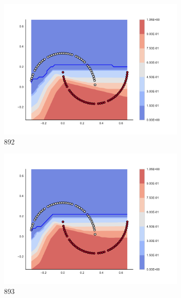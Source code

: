 \begin{figure}[h]
\begin{subfigure}[b]{0.09\textwidth}
    \includegraphics[clip, trim=2.35cm 1.75cm 4.5cm 0cm,width=\textwidth]{img/convergence/892.pdf}
    \caption{892}
    \label{fig:convergence_892}
\end{subfigure}
%
\begin{subfigure}[b]{0.09\textwidth}
    \includegraphics[clip, trim=2.35cm 1.75cm 4.5cm 0cm,width=\textwidth]{img/convergence/893.pdf}
    \caption{893}
    \label{fig:convergence_893}
\end{subfigure}
%
\begin{subfigure}[b]{0.09\textwidth}

\end{subfigure}
\end{figure}
